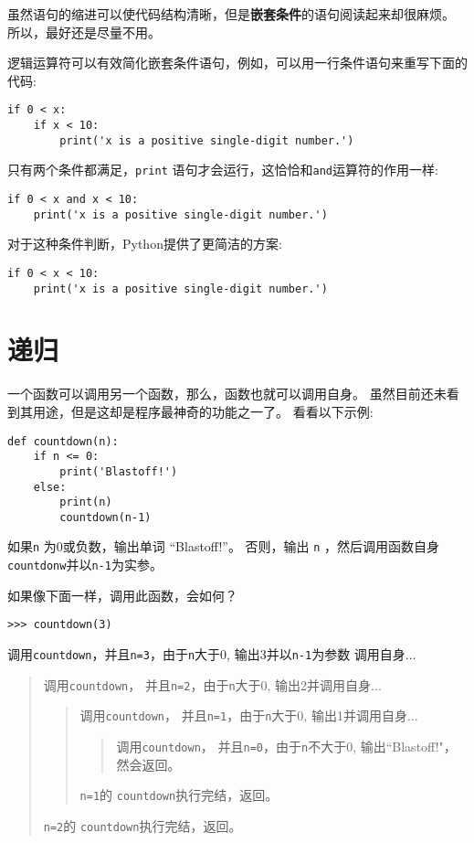 \documentclass[10pt]{book}
\begin{document}
虽然语句的缩进可以使代码结构清晰，但是{\bf 嵌套条件}的语句阅读起来却很麻烦。
所以，最好还是尽量不用。

逻辑运算符可以有效简化嵌套条件语句，例如，可以用一行条件语句来重写下面的代码:

\begin{verbatim}
if 0 < x:
    if x < 10:
        print('x is a positive single-digit number.')
\end{verbatim}
%
只有两个条件都满足，{\tt print} 语句才会运行，这恰恰和{\tt and}运算符的作用一样:

\begin{verbatim}
if 0 < x and x < 10:
    print('x is a positive single-digit number.')
\end{verbatim}

对于这种条件判断，Python提供了更简洁的方案:

\begin{verbatim}
if 0 < x < 10:
    print('x is a positive single-digit number.')
\end{verbatim}


\section{递归}
\label{recursion}

一个函数可以调用另一个函数，那么，函数也就可以调用自身。
虽然目前还未看到其用途，但是这却是程序最神奇的功能之一了。
看看以下示例:

\begin{verbatim}
def countdown(n):
    if n <= 0:
        print('Blastoff!')
    else:
        print(n)
        countdown(n-1)
\end{verbatim}
%
如果{\tt n} 为0或负数，输出单词 ``Blastoff!''。
否则，输出{ \tt n} ，然后调用函数自身{\tt countdonw}并以{\tt n-1}为实参。

如果像下面一样，调用此函数，会如何？

\begin{verbatim}
>>> countdown(3)
\end{verbatim}
%

调用{\tt countdown}，并且{\tt n=3}，由于{\tt n}大于0, 输出3并以{\tt n-1}为参数
调用自身...

\begin{quote}
调用{\tt countdown}， 并且{\tt n=2}，由于{\tt n}大于0, 输出2并调用自身...

\begin{quote}
调用{\tt countdown}， 并且{\tt n=1}，由于{\tt n}大于0, 输出1并调用自身...

\begin{quote}
调用{\tt countdown}， 并且{\tt n=0}，由于{\tt n}不大于0, 输出``Blastoff!"，
然会返回。
\end{quote}

{\tt n=1}的 {\tt countdown}执行完结，返回。
\end{quote}

{\tt n=2}的 {\tt countdown}执行完结，返回。
\end{quote}
\end{document}

